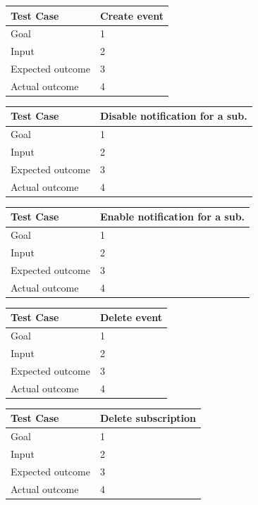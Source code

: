 \documentclass[a4paper]{scrreprt}
\begin{document}
\begin{tabularx}{\linewidth}{|l|X|}
	\hline
	\textbf{Test Case} 	& \textbf{Create event} \\ \hline
	Goal 				& 1 \\ \hline
	Input 				& 2 \\ \hline
	Expected outcome 	& 3 \\ \hline
	Actual outcome 		& 4 \\ \hline
\end{tabularx}
\bigskip
\noindent
\begin{tabularx}{\linewidth}{|l|X|}
	\hline
	\textbf{Test Case} 	& \textbf{Disable notification for a sub.} \\ \hline
	Goal 				& 1 \\ \hline
	Input 				& 2 \\ \hline
	Expected outcome 	& 3 \\ \hline
	Actual outcome 		& 4 \\ \hline
\end{tabularx}
\bigskip
\noindent
\begin{tabularx}{\linewidth}{|l|X|}
	\hline
	\textbf{Test Case} 	& \textbf{Enable notification for a sub.} \\ \hline
	Goal 				& 1 \\ \hline
	Input 				& 2 \\ \hline
	Expected outcome 	& 3 \\ \hline
	Actual outcome 		& 4 \\ \hline
\end{tabularx}
\bigskip
\noindent
\begin{tabularx}{\linewidth}{|l|X|}
	\hline
	\textbf{Test Case} 	& \textbf{Delete event} \\ \hline
	Goal 				& 1 \\ \hline
	Input 				& 2 \\ \hline
	Expected outcome 	& 3 \\ \hline
	Actual outcome 		& 4 \\ \hline
\end{tabularx}
\bigskip
\noindent
\begin{tabularx}{\linewidth}{|l|X|}
	\hline
	\textbf{Test Case} 	& \textbf{Delete subscription} \\ \hline
	Goal 				& 1 \\ \hline
	Input 				& 2 \\ \hline
	Expected outcome 	& 3 \\ \hline
	Actual outcome 		& 4 \\ \hline
\end{tabularx}
\end{document}
